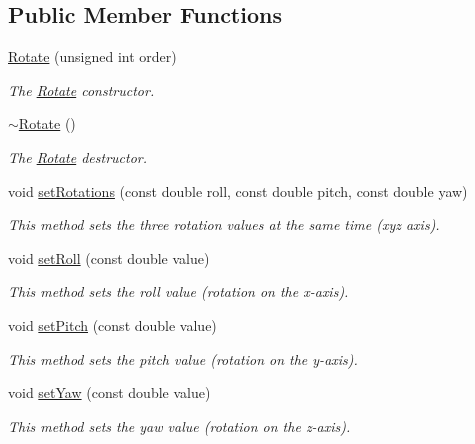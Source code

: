 \subsection*{Public Member Functions}
\begin{DoxyCompactItemize}
\item 
\hyperlink{class_hoa3_d_1_1_rotate_a9a5750cbff8e0449b3de62e7de338a8b}{Rotate} (unsigned int order)
\begin{DoxyCompactList}\small\item\em The \hyperlink{class_hoa3_d_1_1_rotate}{Rotate} constructor. \end{DoxyCompactList}\item 
\hyperlink{class_hoa3_d_1_1_rotate_a13a37adfe31314b7d5844333a4e587ab}{$\sim$\-Rotate} ()
\begin{DoxyCompactList}\small\item\em The \hyperlink{class_hoa3_d_1_1_rotate}{Rotate} destructor. \end{DoxyCompactList}\item 
void \hyperlink{class_hoa3_d_1_1_rotate_a190ffb26419c5ab6c7935d48e9a7e23b}{set\-Rotations} (const double roll, const double pitch, const double yaw)
\begin{DoxyCompactList}\small\item\em This method sets the three rotation values at the same time (xyz axis). \end{DoxyCompactList}\item 
void \hyperlink{class_hoa3_d_1_1_rotate_a89599a9cd8c10240ce71b8fd7bdbb3b7}{set\-Roll} (const double value)
\begin{DoxyCompactList}\small\item\em This method sets the roll value (rotation on the x-\/axis). \end{DoxyCompactList}\item 
void \hyperlink{class_hoa3_d_1_1_rotate_aeb7e844c29c2f9bb9cc7de3ef89385f6}{set\-Pitch} (const double value)
\begin{DoxyCompactList}\small\item\em This method sets the pitch value (rotation on the y-\/axis). \end{DoxyCompactList}\item 
void \hyperlink{class_hoa3_d_1_1_rotate_a18df4eaec4e8c7c60f8234632af06d6f}{set\-Yaw} (const double value)
\begin{DoxyCompactList}\small\item\em This method sets the yaw value (rotation on the z-\/axis). \end{DoxyCompactList}\item 

\end{DoxyCompactItemize}
